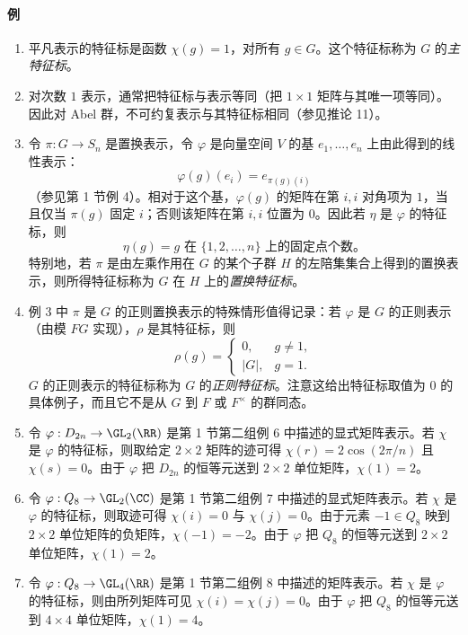 \paragraph{例}
\begin{enumerate}[label=(\arabic*)]
  \item 平凡表示的特征标是函数 $\chi(g)=1$，对所有 $g\in G$。这个特征标称为 $G$ 的\emph{主特征标}。
  \item 对次数 $1$ 表示，通常把特征标与表示等同（把 $1\times1$ 矩阵与其唯一项等同）。因此对 Abel 群，不可约复表示与其特征标相同（参见推论 11）。
  \item 令 $\pi:G\to S_n$ 是置换表示，令 $\varphi$ 是向量空间 $V$ 的基 $e_1,
  \ldots,e_n$ 上由此得到的线性表示：
  \[
    \varphi(g)(e_i)=e_{\pi(g)(i)}
  \]
  （参见第 1 节例 4）。相对于这个基，$\varphi(g)$ 的矩阵在第 $i,i$ 对角项为 $1$，当且仅当 $\pi(g)$ 固定 $i$；否则该矩阵在第 $i,i$ 位置为 $0$。因此若 $\eta$ 是 $\varphi$ 的特征标，则
  \[
    \eta(g)=g\text{ 在 }\{1,2,
    \ldots,n\}\text{ 上的固定点个数。}
  \]
  特别地，若 $\pi$ 是由左乘作用在 $G$ 的某个子群 $H$ 的左陪集集合上得到的置换表示，则所得特征标称为 $G$ 在 $H$ 上的\emph{置换特征标}。
  \item 例 3 中 $\pi$ 是 $G$ 的正则置换表示的特殊情形值得记录：若 $\varphi$ 是 $G$ 的正则表示（由模 $FG$ 实现），$\rho$ 是其特征标，则
  \[
    \rho(g)=\begin{cases}
      0,&g\neq1,\\
      |G|,&g=1.
    \end{cases}
  \]
  $G$ 的正则表示的特征标称为 $G$ 的\emph{正则特征标}。注意这给出特征标取值为 $0$ 的具体例子，而且它不是从 $G$ 到 $F$ 或 $F^\times$ 的群同态。
  \item 令 $\varphi:D_{2n}\to\GL_2(\RR)$ 是第 1 节第二组例 6 中描述的显式矩阵表示。若 $\chi$ 是 $\varphi$ 的特征标，则取给定 $2\times2$ 矩阵的迹可得 $\chi(r)=2\cos(2\pi/n)$ 且 $\chi(s)=0$。由于 $\varphi$ 把 $D_{2n}$ 的恒等元送到 $2\times2$ 单位矩阵，$\chi(1)=2$。
  \item 令 $\varphi:Q_8\to\GL_2(\CC)$ 是第 1 节第二组例 7 中描述的显式矩阵表示。若 $\chi$ 是 $\varphi$ 的特征标，则取迹可得 $\chi(i)=0$ 与 $\chi(j)=0$。由于元素 $-1\in Q_8$ 映到 $2\times2$ 单位矩阵的负矩阵，$\chi(-1)=-2$。由于 $\varphi$ 把 $Q_8$ 的恒等元送到 $2\times2$ 单位矩阵，$\chi(1)=2$。
  \item 令 $\varphi:Q_8\to\GL_4(\RR)$ 是第 1 节第二组例 8 中描述的矩阵表示。若 $\chi$ 是 $\varphi$ 的特征标，则由所列矩阵可见 $\chi(i)=\chi(j)=0$。由于 $\varphi$ 把 $Q_8$ 的恒等元送到 $4\times4$ 单位矩阵，$\chi(1)=4$。
\end{enumerate}

